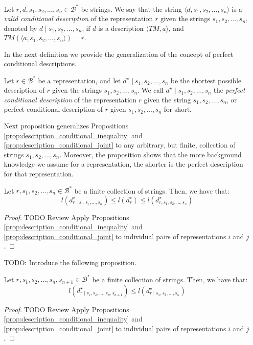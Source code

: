 \begin{definition}
Let $r, d, s_1, s_2, \ldots, s_n \in \mathcal{B}^\ast$ be strings. We say that the string $\langle d, s_1, s_2, \ldots, s_n \rangle$ is a \emph{valid conditional description} of the representation $r$ given the strings $s_1, s_2, \ldots, s_n$, denoted by $d \mid s_1, s_2, \ldots, s_n$, if $d$ is a description $\langle TM, a \rangle$, and $TM \left(\langle a, s_1, s_2, \ldots, s_n \rangle \right) = r$.
\end{definition}

In the next definition we provide the generalization of the concept of perfect conditional descriptions.

\begin{definition}
Let $r \in \mathcal{B}^\ast$ be a representation, and let $d^\star \mid s_1, s_2, \ldots, s_n$ be the shortest possible description of $r$ given the strings $s_1, s_2, \ldots, s_n$. We call $d^\star \mid s_1, s_2, \ldots, s_n$ the \emph{perfect conditional description} of the representation $r$ given the string $s_1, s_2, \ldots, s_n$, or perfect conditional description of $r$ given $s_1, s_2, \ldots, s_n$ for short.
\end{definition}

Next proposition generalizes Propositions \ref{prop:description_conditional_inequality} and \ref{prop:description_conditional_joint} to any arbitrary, but finite, collection of strings $s_1, s_2, \ldots, s_n$. Moreover, the proposition shows that the more background knowledge we assume for a representation, the shorter is the perfect description for that representation.

\begin{proposition}
Let $r, s_1, s_2, \ldots, s_n \in \mathcal{B}^\ast$ be a finite collection of strings. Then, we have that:
\[
l \left( d^\star_{r \mid s_1, s_2, \ldots, s_n} \right) \leq l \left( d^\star_r \right) \leq l \left( d^\star_{r,s_1, s_2, \ldots, s_n} \right)
\]
\end{proposition}
\begin{proof}
{\color{red} TODO Review} Apply Propositions \ref{prop:description_conditional_inequality} and \ref{prop:description_conditional_joint} to individual pairs of representations $i$ and $j$.
\end{proof}

{\color{red} TODO: Introduce the following proposition.}

\begin{proposition}
Let $r, s_1, s_2, \ldots, s_n, s_{n+1} \in \mathcal{B}^\ast$ be a finite collection of strings. Then, we have that:
\[
l \left( d^\star_{r \mid s_1, s_2, \ldots, s_n, s_{n+1}} \right) \leq l \left( d^\star_{r \mid s_1, s_2, \ldots, s_n} \right)
\]
\end{proposition}
\begin{proof}
{\color{red} TODO Review} Apply Propositions \ref{prop:description_conditional_inequality} and \ref{prop:description_conditional_joint} to individual pairs of representations $i$ and $j$.
\end{proof}

